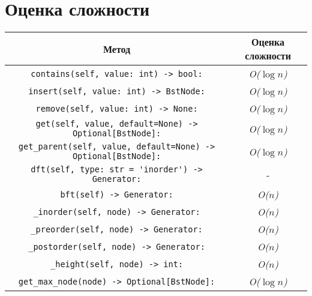 \section*{Оценка сложности}

\begin{table}[H]
    \centering
    \begin{tabular}{|c|c|}
        \hline
        Метод & Оценка сложности \\
        \hline
        \verb|contains(self, value: int) -> bool:| & \textit{O($ \log{n} $)} \\
        \hline
        \verb|insert(self, value: int) -> BstNode:| & \textit{O($ \log{n} $)} \\
        \hline
        \verb|remove(self, value: int) -> None:| & \textit{O($ \log{n} $)} \\
        \hline
        \verb|get(self, value, default=None) -> Optional[BstNode]:| & \textit{O($ \log{n} $)} \\
        \hline
        \verb|get_parent(self, value, default=None) -> Optional[BstNode]:| & \textit{O($ \log{n} $)} \\
        \hline
        \verb|dft(self, type: str = 'inorder') -> Generator:| & - \\
        \hline
        \verb|bft(self) -> Generator:| & \textit{O($ n $)} \\
        \hline
        \verb|_inorder(self, node) -> Generator:| & \textit{O($ n $)} \\
        \hline
        \verb|_preorder(self, node) -> Generator:| & \textit{O($ n $)} \\
        \hline
        \verb|_postorder(self, node) -> Generator:| & \textit{O($ n $)} \\
        \hline
        \verb|_height(self, node) -> int:| & \textit{O($ n $)} \\
        \hline
        \verb|get_max_node(node) -> Optional[BstNode]:| & \textit{O($ \log{n} $)} \\
        \hline
    \end{tabular}
    \label{tab:complexity}
\end{table}
